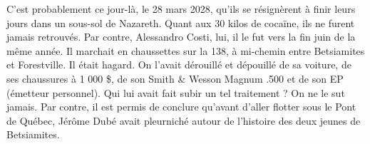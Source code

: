 C’est probablement ce jour-là, le 28 mars 2028, qu’ils se résignèrent à finir leurs jours dans un sous-sol de Nazareth. Quant aux 30 kilos de cocaïne, ils ne furent jamais retrouvés. Par contre, Alessandro Costi, lui, il le fut vers la fin juin de la même année. Il marchait en chaussettes sur la 138, à mi-chemin entre Betsiamites et Forestville. Il était hagard. On l’avait dérouillé et dépouillé de sa voiture, de ses chaussures à 1 000 \$, de son Smith \& Wesson Magnum .500 et de son EP (émetteur personnel). Qui lui avait fait subir un tel traitement ? On ne le sut jamais. Par contre, il est permis de conclure qu’avant d’aller flotter sous le Pont de Québec, Jérôme Dubé avait pleurniché autour de l’histoire des deux jeunes de Betsiamites.
